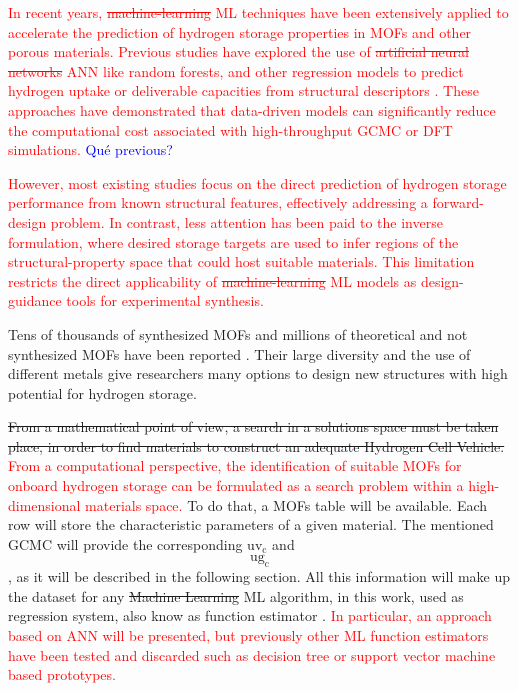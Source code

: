 \documentclass[review]{elsarticle}
\newcommand{\ugc}{$\mathrm{ug_c}$}
\newcommand{\uvc}{\mathrm{uv_c}}
\begin{document}
\textcolor{red}{
In recent years, \sout{machine-learning} ML techniques have been extensively applied to accelerate the prediction of hydrogen storage properties in MOFs and other porous materials. Previous studies have explored the use of \sout{artificial neural networks} ANN like random forests, and other regression models to predict hydrogen uptake or deliverable capacities from structural descriptors \cite{gm21,sra23,qxx+24,cbc+25,as21,wwyq25,sra23}. These approaches have demonstrated that data-driven models can significantly reduce the computational cost associated with high-throughput GCMC or DFT simulations.}
\textcolor{blue}{Qué previous?}

\textcolor{red}{
However, most existing studies focus on the direct prediction of hydrogen storage performance from known structural features, effectively addressing a forward-design problem. In contrast, less attention has been paid to the inverse formulation, where desired storage targets are used to infer regions of the structural-property space that could host suitable materials. This limitation restricts the direct applicability of \sout{machine-learning} ML models as design-guidance tools for experimental synthesis.}


Tens of thousands of synthesized MOFs and millions of theoretical and 
not synthesized MOFs have been reported \cite{llk+22, spst21}. Their large 
diversity and the use of different metals give researchers many options to design new structures with high potential for hydrogen storage.

\sout{From a mathematical point of view, a search in a solutions space must be taken place, in order to find materials to construct an adequate Hydrogen Cell Vehicle.}
\textcolor{red}{From a computational perspective, the identification of suitable MOFs for onboard hydrogen storage can be formulated as a search problem within a high-dimensional materials space.}
To do that, a MOFs table will be available. Each row will store the characteristic parameters of a given material. The mentioned GCMC will provide the corresponding $\uvc$ and $\ugc$, as it will be described in the following section. All this information will make up the dataset for any \sout{Machine Learning} ML algorithm, in this work, used as regression system, also know as function estimator \cite{geron2019}. \textcolor{red}{In particular, an approach based on ANN will be presented, but previously other ML function estimators  have been tested and discarded such as decision tree or support vector machine based prototypes.}  
\end{document}
